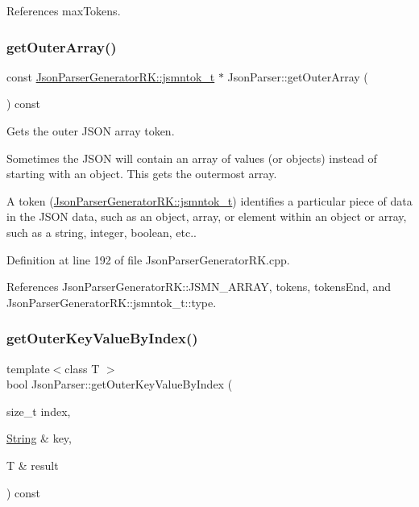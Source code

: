 References max\+Tokens.

\mbox{\label{class_json_parser_a91ffa7e1c4d2fbc2524533d65c31b605}} 
\subsubsection{\texorpdfstring{get\+Outer\+Array()}{getOuterArray()}}
{\footnotesize\ttfamily const \hyperlink{struct_json_parser_generator_r_k_1_1jsmntok__t}{Json\+Parser\+Generator\+R\+K\+::jsmntok\+\_\+t} $\ast$ Json\+Parser\+::get\+Outer\+Array (\begin{DoxyParamCaption}{ }\end{DoxyParamCaption}) const}



Gets the outer J\+S\+ON array token. 

Sometimes the J\+S\+ON will contain an array of values (or objects) instead of starting with an object. This gets the outermost array.

A token (\hyperlink{struct_json_parser_generator_r_k_1_1jsmntok__t}{Json\+Parser\+Generator\+R\+K\+::jsmntok\+\_\+t}) identifies a particular piece of data in the J\+S\+ON data, such as an object, array, or element within an object or array, such as a string, integer, boolean, etc.. 

Definition at line 192 of file Json\+Parser\+Generator\+R\+K.\+cpp.



References Json\+Parser\+Generator\+R\+K\+::\+J\+S\+M\+N\+\_\+\+A\+R\+R\+AY, tokens, tokens\+End, and Json\+Parser\+Generator\+R\+K\+::jsmntok\+\_\+t\+::type.

\mbox{\label{class_json_parser_a4718893bc6350e129a9acbf6cb5a47ad}} 
\subsubsection{\texorpdfstring{get\+Outer\+Key\+Value\+By\+Index()}{getOuterKeyValueByIndex()}}
{\footnotesize\ttfamily template$<$class T $>$ \\
bool Json\+Parser\+::get\+Outer\+Key\+Value\+By\+Index (\begin{DoxyParamCaption}\item[{size\+\_\+t}]{index,  }\item[{\hyperlink{class_string}{String} \&}]{key,  }\item[{T \&}]{result }\end{DoxyParamCaption}) const\hspace{0.3cm}{\ttfamily [inline]}}



